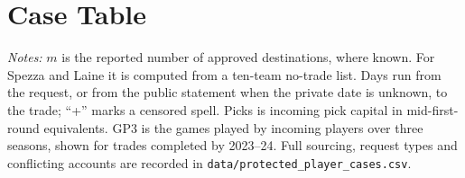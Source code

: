 \clearpage\section{Case Table}\label{app:cases}
\begin{table}[h]\centering\scriptsize
\caption{Star exits, demands and refusals, 2007--08 to 2026--27}\label{tab:cases}
\resizebox{\linewidth}{!}{}
\begin{minipage}{0.97\linewidth}\footnotesize\vspace{4pt}
\emph{Notes:} $m$ is the reported number of approved destinations, where known. For Spezza and Laine it is computed from a ten-team no-trade list. Days run from the request, or from the public statement when the private date is unknown, to the trade; ``+'' marks a censored spell. Picks is incoming pick capital in mid-first-round equivalents. GP3 is the games played by incoming players over three seasons, shown for trades completed by 2023--24. Full sourcing, request types and conflicting accounts are recorded in \texttt{data/protected\_player\_cases.csv}.
\end{minipage}
\end{table}
